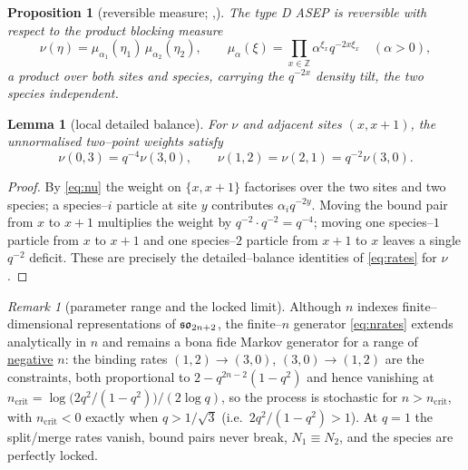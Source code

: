 \documentclass[11pt]{article}
\theoremstyle{plain}
\newtheorem{proposition}[theorem]{Proposition}
\newtheorem{lemma}[theorem]{Lemma}
\theoremstyle{definition}
\theoremstyle{remark}
\newtheorem{remark}[theorem]{Remark}
\newcommand{\Z}{\mathbb{Z}}\newcommand{\R}{\mathbb{R}}\newcommand{\N}{\mathbb{N}}
\begin{document}
\begin{proposition}[reversible measure; {\cite[Prop.~1.3]{KLLPZ}},{\cite[\S3.1]{REU}}]
\label{prop:measure}
The type D ASEP is reversible with respect to the product blocking measure
\begin{equation}\label{eq:nu}
  \nu(\eta)=\mu_{\alpha_1}(\eta_1)\,\mu_{\alpha_2}(\eta_2),\qquad
  \mu_\alpha(\xi)=\prod_{x\in\Z}\alpha^{\xi_x}q^{-2x\xi_x}\quad(\alpha>0),
\end{equation}
a product over both sites and species, carrying the $q^{-2x}$ density tilt, the two
species independent.
\end{proposition}

\begin{lemma}[local detailed balance]\label{lem:db}
For $\nu$ and adjacent sites $(x,x+1)$, the unnormalised two--point weights satisfy
\begin{equation}\label{eq:dbrel}
  \nu(0,3)=q^{-4}\nu(3,0),\qquad \nu(1,2)=\nu(2,1)=q^{-2}\nu(3,0).
\end{equation}
\end{lemma}
\begin{proof}
By \eqref{eq:nu} the weight on $\{x,x+1\}$ factorises over the two sites and two
species; a species--$i$ particle at site $y$ contributes $\alpha_i q^{-2y}$. Moving the
bound pair from $x$ to $x+1$ multiplies the weight by $q^{-2}\cdot q^{-2}=q^{-4}$;
moving one species--$1$ particle from $x$ to $x+1$ and one species--$2$ particle from
$x+1$ to $x$ leaves a single $q^{-2}$ deficit. These are precisely the
detailed--balance identities of \eqref{eq:rates} for $\nu$.
\end{proof}

\begin{remark}[parameter range and the locked limit]\label{rem:range}
Although $n$ indexes finite--dimensional representations of $\mathfrak{so}_{2n+2}$, the
finite--$n$ generator \eqref{eq:nrates} extends analytically in $n$ and remains a
bona fide Markov generator for a range of \underline{negative} $n$: the binding rates
$(1,2)\to(3,0)$, $(3,0)\to(1,2)$ are the constraints, both proportional to
$2-q^{2n-2}(1-q^2)$ and hence vanishing at
$n_{\mathrm{crit}}=\log\!\big(2q^2/(1-q^2)\big)/(2\log q)$, so the process is stochastic
for $n>n_{\mathrm{crit}}$, with $n_{\mathrm{crit}}<0$ exactly when $q>1/\sqrt3$ (i.e.\
$2q^2/(1-q^2)>1$). At
$q=1$ the split/merge rates vanish, bound pairs never break, $N_1\equiv N_2$, and the
species are perfectly locked.
\end{remark}
\end{document}
